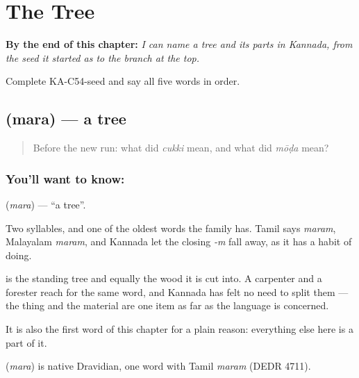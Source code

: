 
\chapter{The Tree}
\label{ch:ka-tree}

\begin{chapteropening}
\textbf{By the end of this chapter:} \emph{I can name a tree and its parts in Kannada, from the seed it started as to the branch at the top.}

Complete KA-C54-seed and say all five words in order.
\end{chapteropening}

\section[\texorpdfstring{\kn{ಮರ} (mara)}{ಮರ (mara)}]{ (mara) — a tree}

\label{lesson:KA-C54-tree}



\begin{quote}
Before the new run: what did \emph{cukki} mean, and what did \emph{mōḍa} mean?
\end{quote}

\subsection*{You'll want to know: }
\textbf{} (\emph{mara}) — \textquotedblleft{}a tree\textquotedblright{}.

Two syllables, and one of the oldest words the family has. Tamil says \emph{maram}, Malayalam \emph{maram}, and Kannada let the closing \emph{-m} fall away, as it has a habit of doing.

 is the standing tree and equally the wood it is cut into. A carpenter and a forester reach for the same word, and Kannada has felt no need to split them — the thing and the material are one item as far as the language is concerned.

It is also the first word of this chapter for a plain reason: everything else here is a part of it.

\begin{cousinweb}
\textbf{} (\emph{mara}) is native Dravidian, one word with Tamil \emph{maram} (DEDR 4711).
\end{cousinweb}

